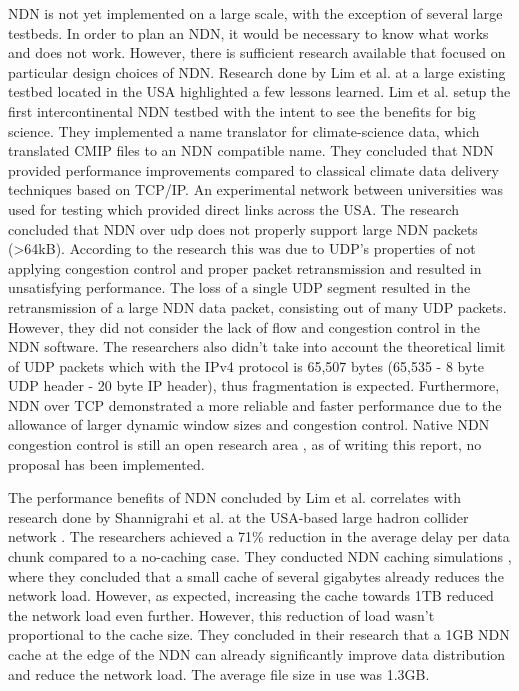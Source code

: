 NDN is not yet implemented on a large scale, with the exception of several large testbeds. In order to plan an NDN, it would be necessary to know what works and does not work. However, there is sufficient research available that focused on particular design choices of NDN. Research done by Lim et al. \cite{lim2018ndn} at a large existing testbed located in the USA \cite{ndn-testbed-status} highlighted a few lessons learned. Lim et al. setup the first intercontinental NDN testbed with the intent to see the benefits for big science. They implemented a name translator for climate-science data, which translated CMIP files to an NDN compatible name. They concluded that NDN provided performance improvements compared to classical climate data delivery techniques based on TCP/IP. An experimental network between universities was used for testing which provided direct links across the USA. The research concluded that NDN over \gls{udp} does not properly support large NDN packets (\textgreater 64kB). According to the research this was due to UDP's properties of not applying congestion control and proper packet retransmission and resulted in unsatisfying performance. The loss of a single UDP segment resulted in the retransmission of a large NDN data packet, consisting out of many UDP packets. However, they did not consider the lack of flow and congestion control in the NDN software. The researchers also didn't take into account the theoretical limit of UDP packets which with the IPv4 protocol is 65,507 bytes (65,535 - 8 byte UDP header - 20 byte IP header), thus fragmentation is expected. Furthermore, NDN over TCP demonstrated a more reliable and faster performance due to the allowance of larger dynamic window sizes and congestion control. Native NDN congestion control is still an open research area \cite{ren2016congestion}, as of writing this report, no proposal has been implemented.

The performance benefits of NDN concluded by Lim et al. correlates with research done by Shannigrahi et al. at the USA-based large hadron collider network \cite{shannigrahi2015named}. The researchers achieved a 71\% reduction in the average delay per data chunk compared to a no-caching case. They conducted NDN caching simulations \cite{shannigrahi2017request}, where they concluded that a small cache of several gigabytes already reduces the network load. However, as expected, increasing the cache towards 1TB reduced the network load even further. However, this reduction of load wasn't proportional to the cache size. They concluded in their research that a 1GB NDN cache at the edge of the NDN can already significantly improve data distribution and reduce the network load. The average file size in use was 1.3GB.

